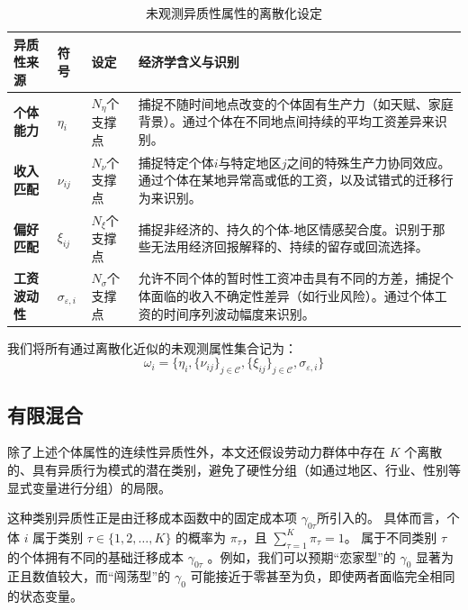 \documentclass[master, final]{zufe-thesis}
\begin{document}
\begin{table}[!ht]
  \centering
  \caption{未观测异质性属性的离散化设定}
  \label{tab:unobserved_heterogeneity_setting}
  \begin{tabularx}{\textwidth}{@{}lllX@{}}
    \toprule
    \textbf{异质性来源} & \textbf{符号} & \textbf{设定} & \textbf{经济学含义与识别} \\ 
    \midrule
    \textbf{个体能力} & $\eta_i$ & $N_\eta$个支撑点 & 捕捉不随时间地点改变的个体固有生产力（如天赋、家庭背景）。通过个体在不同地点间持续的平均工资差异来识别。 \\
    \textbf{收入匹配} & $\nu_{ij}$ & $N_\nu$个支撑点 & 捕捉特定个体$i$与特定地区$j$之间的特殊生产力协同效应。通过个体在某地异常高或低的工资，以及试错式的迁移行为来识别。 \\
    \textbf{偏好匹配} & $\xi_{ij}$ & $N_\xi$个支撑点 & 捕捉非经济的、持久的个体-地区情感契合度。识别于那些无法用经济回报解释的、持续的留存或回流选择。 \\
    \textbf{工资波动性} & $\sigma_{\varepsilon,i}$ & $N_\sigma$个支撑点 & 允许不同个体的暂时性工资冲击具有不同的方差，捕捉个体面临的收入不确定性差异（如行业风险）。通过个体工资的时间序列波动幅度来识别。 \\
    \bottomrule
  \end{tabularx}
\vspace{0.5em}
\footnotesize
\end{table}

我们将所有通过离散化近似的未观测属性集合记为：
$$\omega_i = \{\eta_i, \{\nu_{ij}\}_{j \in \mathcal{C}}, \{\xi_{ij}\}_{j \in \mathcal{C}}, \sigma_{\varepsilon,i}\}$$



\subsection{有限混合}

除了上述个体属性的连续性异质性外，本文还假设劳动力群体中存在 $K$ 个离散的、具有异质行为模式的潜在类别，避免了硬性分组（如通过地区、行业、性别等显式变量进行分组）的局限。

这种类别异质性正是由迁移成本函数中的固定成本项 $\gamma_{0\tau}$所引入的。
具体而言，个体 $i$ 属于类别 $\tau \in \{1, 2, \dots, K\}$ 的概率为 $\pi_\tau$，且 $\sum\limits_{\tau=1}^K \pi_\tau = 1$。
属于不同类别 $\tau$ 的个体拥有不同的基础迁移成本 $\gamma_{0\tau}$ 。例如，我们可以预期“恋家型”的 $\gamma_0$ 显著为正且数值较大，而“闯荡型”的 $\gamma_0$ 可能接近于零甚至为负，即使两者面临完全相同的状态变量。
\end{document}
